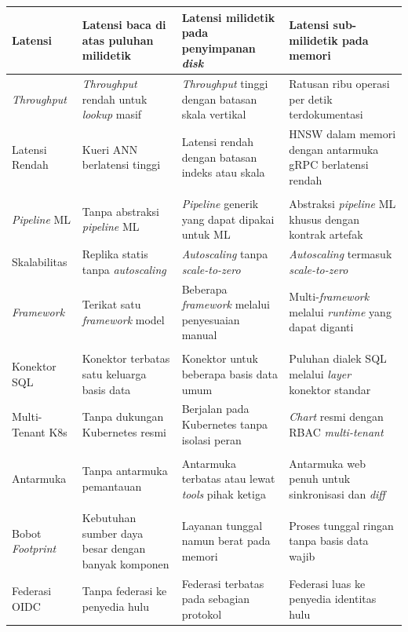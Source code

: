 {\begin{longtable}{|>{\raggedright\arraybackslash}m{2.6cm}|>{\raggedright\arraybackslash}m{3.4cm}|>{\raggedright\arraybackslash}m{3.5cm}|>{\raggedright\arraybackslash}m{3.5cm}|}
\hline
Latensi & Latensi baca di atas puluhan milidetik & Latensi milidetik pada penyimpanan \textit{disk} & Latensi sub-milidetik pada memori \\
\hline
\textit{Through\-put} & \textit{Throughput} rendah untuk \textit{lookup} masif & \textit{Throughput} tinggi dengan batasan skala vertikal & Ratusan ribu operasi per detik terdokumentasi \\
\hline
Latensi Rendah & Kueri ANN berlatensi tinggi & Latensi rendah dengan batasan indeks atau skala & HNSW dalam memori dengan antarmuka gRPC berlatensi rendah \\
\hline
\multicolumn{4}{|l|}{\textbf{\textit{Model Lifecycle}}} \\
\hline
\textit{Pipeline} ML & Tanpa abstraksi \textit{pipeline} ML & \textit{Pipeline} generik yang dapat dipakai untuk ML & Abstraksi \textit{pipeline} ML khusus dengan kontrak artefak \\
\hline
Skala\-bilitas & Replika statis tanpa \textit{autoscaling} & \textit{Autoscaling} tanpa \textit{scale-to-zero} & \textit{Autoscaling} termasuk \textit{scale-to-zero} \\
\hline
\textit{Frame\-work} & Terikat satu \textit{framework} model & Beberapa \textit{framework} melalui penyesuaian manual & Multi-\textit{framework} melalui \textit{runtime} yang dapat diganti \\
\hline
\multicolumn{4}{|l|}{\textbf{Observabilitas dan BI}} \\
\hline
Konektor SQL & Konektor terbatas satu keluarga basis data & Konektor untuk beberapa basis data umum & Puluhan dialek SQL melalui \textit{layer} konektor standar \\
\hline
Multi-Tenant K8s & Tanpa dukungan Kubernetes resmi & Berjalan pada Kubernetes tanpa isolasi peran & \textit{Chart} resmi dengan RBAC \textit{multi-tenant} \\
\hline
\multicolumn{4}{|l|}{\textbf{GitOps}} \\
\hline
Antar\-muka & Tanpa antarmuka pemantauan & Antarmuka terbatas atau lewat \textit{tools} pihak ketiga & Antarmuka web penuh untuk sinkronisasi dan \textit{diff} \\
\hline
\multicolumn{4}{|l|}{\textbf{Keamanan Platform}} \\
\hline
Bobot \textit{Footprint} & Kebutuhan sumber daya besar dengan banyak komponen & Layanan tunggal namun berat pada memori & Proses tunggal ringan tanpa basis data wajib \\
\hline
Federasi OIDC & Tanpa federasi ke penyedia hulu & Federasi terbatas pada sebagian protokol & Federasi luas ke penyedia identitas hulu \\

\end{longtable}}
